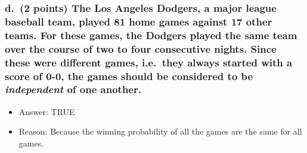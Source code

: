 \documentclass[
]{article}
\providecommand{\tightlist}{%
  \setlength{\itemsep}{0pt}\setlength{\parskip}{0pt}}
\begin{document}
\hypertarget{d.-2-points-the-los-angeles-dodgers-a-major-league-baseball-team-played-81-home-games-against-17-other-teams.-for-these-games-the-dodgers-played-the-same-team-over-the-course-of-two-to-four-consecutive-nights.-since-these-were-different-games-i.e.-they-always-started-with-a-score-of-0-0-the-games-should-be-considered-to-be-independent-of-one-another.}{%
\subsubsection{\texorpdfstring{d.~(2 points) The Los Angeles Dodgers, a
major league baseball team, played 81 home games against 17 other teams.
For these games, the Dodgers played the same team over the course of two
to four consecutive nights. Since these were different games, i.e.~they
always started with a score of 0-0, the games should be considered to be
\emph{independent} of one
another.}{d.~(2 points) The Los Angeles Dodgers, a major league baseball team, played 81 home games against 17 other teams. For these games, the Dodgers played the same team over the course of two to four consecutive nights. Since these were different games, i.e.~they always started with a score of 0-0, the games should be considered to be independent of one another.}}\label{d.-2-points-the-los-angeles-dodgers-a-major-league-baseball-team-played-81-home-games-against-17-other-teams.-for-these-games-the-dodgers-played-the-same-team-over-the-course-of-two-to-four-consecutive-nights.-since-these-were-different-games-i.e.-they-always-started-with-a-score-of-0-0-the-games-should-be-considered-to-be-independent-of-one-another.}}

\begin{itemize}
\tightlist
\item
  Answer: TRUE
\item
  Reason: Because the winning probability of all the games are the same
  for all games.
\end{itemize}
\end{document}
